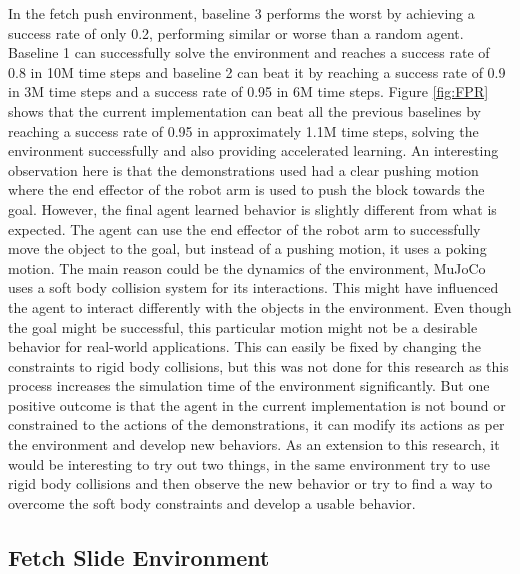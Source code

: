 In the fetch push environment, baseline 3 performs the worst by achieving a success rate of only 0.2, performing similar or worse than a random agent. Baseline 1 can successfully solve the environment and reaches a success rate of 0.8 in 10M time steps and baseline 2 can beat it by reaching a success rate of 0.9 in 3M time steps and a success rate of 0.95 in 6M time steps. Figure \ref{fig:FPR} shows that the current implementation can beat all the previous baselines by reaching a success rate of 0.95 in approximately 1.1M time steps, solving the environment successfully and also providing accelerated learning. An interesting observation here is that the demonstrations used had a clear pushing motion where the end effector of the robot arm is used to push the block towards the goal. However, the final agent learned behavior is slightly different from what is expected. The agent can use the end effector of the robot arm to successfully move the object to the goal, but instead of a pushing motion, it uses a poking motion. The main reason could be the dynamics of the environment, MuJoCo uses a soft body collision system for its interactions. This might have influenced the agent to interact differently with the objects in the environment. Even though the goal might be successful, this particular motion might not be a desirable behavior for real-world applications. This can easily be fixed by changing the constraints to rigid body collisions, but this was not done for this research as this process increases the simulation time of the environment significantly. But one positive outcome is that the agent in the current implementation is not bound or constrained to the actions of the demonstrations, it can modify its actions as per the environment and develop new behaviors. As an extension to this research, it would be interesting to try out two things, in the same environment try to use rigid body collisions and then observe the new behavior or try to find a way to overcome the soft body constraints and develop a usable behavior. \\

\subsection{Fetch Slide Environment}

